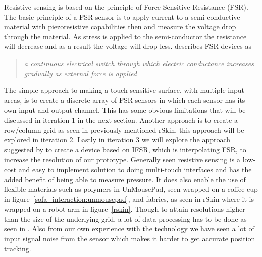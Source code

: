 Resistive sensing is based on the principle of Force Sensitive Resistance (FSR).
The basic principle of a FSR sensor is to apply current to a semi-conductive material with piezoresistive capabilities then and measure the voltage drop through the material.
As stress is applied to the semi-conductor the resistance will decrease and as a result the voltage will drop less. 
\citet{rosenberg2009unmousepad} describes FSR devices as 
\begin{quotation}
\emph{a continuous electrical switch through which electric conductance increases gradually as external force is applied}
\end{quotation}
The simple approach to making a touch sensitive surface, with multiple input areas, is to create a discrete array of FSR sensors in which each sensor has its own input and output channel.
This has some obvious limitations that will be discussed in iteration 1 in the next section.
Another approach is to create a row/column grid as seen in previously mentioned rSkin, this approach will be explored in iteration 2.
Lastly in iteration 3 we will explore the approach suggested by \citet{rosenberg2009unmousepad} to create a device based on IFSR, which is interpolating FSR, to increase the resolution of our prototype.
Generally seen resistive sensing is a low-cost and easy to implement solution to doing multi-touch interfaces and has the added benefit of being able to measure pressure.
It does also enable the use of flexible materials such as polymers in UnMousePad, seen wrapped on a coffee cup in figure~\ref{sofa_interaction:unmousepad}, and fabrics, as seen in rSkin where it is wrapped on a robot arm in figure~\ref{rskin}.
Though to attain resolutions higher than the size of the underlying grid, a lot of data processing has to be done as seen in \citep{rosenberg2009unmousepad}.
Also from our own experience with the technology we have seen a lot of input signal noise from the sensor which makes it harder to get accurate position tracking.   

